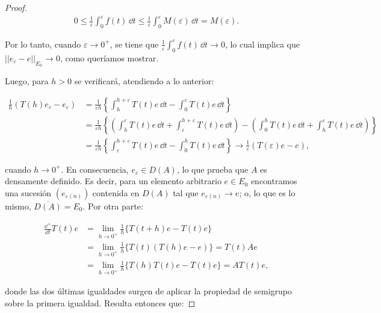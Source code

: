 \begin{proof}
    \begin{align*}
        0 \leq \frac{1}{\varepsilon} \int_0^{\varepsilon} f(t) \, \dd t \leq \frac{1}{\varepsilon} \int_0^{\varepsilon} M(\varepsilon) \, \dd t = M(\varepsilon).
    \end{align*}

    Por lo tanto, cuando $\varepsilon \rightarrow 0^+$, se tiene que $\frac{1}{\varepsilon}\int_0^{\varepsilon} f(t) \, \dd t \rightarrow 0$, lo cual implica que $||e_{\varepsilon} - e||_{E_0} \rightarrow 0$, como queríamos mostrar.

    Luego, para $h > 0$ se verificará, atendiendo a lo anterior:

    \begin{align*}
        \frac{1}{h}(T(h)e_{\varepsilon} - e_{\varepsilon}) &= \frac{1}{\varepsilon h} \left \{\int_{h}^{h + \varepsilon} T(t)e \, \dd t - \int_0^{\varepsilon} T(t)e \, \dd t \right \}\\
        &= \frac{1}{\varepsilon h} \left \{ \left ( \int_{h}^{\varepsilon} T(t)e \, \dd t + \int_{\varepsilon}^{h + \varepsilon} T(t)e \, \dd t\right ) - \left ( \int_0^{h} T(t)e \, \dd t + \int_h^{\varepsilon} T(t)e \, \dd t \right ) \right \}\\
        &= \frac{1}{\varepsilon h} \left \{\int_{\varepsilon}^{h + \varepsilon} T(t)e \, \dd t - \int_0^{h} T(t)e \, \dd t \right \} \rightarrow \frac{1}{\varepsilon}(T(\varepsilon)e - e),
    \end{align*}

    cuando $h \rightarrow 0^+$. En consecuencia, $e_{\varepsilon} \in D(A)$, lo que prueba que $A$ es densamente definido. Es decir, para un elemento arbitrario $e \in E_0$ encontramos una sucesión $(e_{\varepsilon(n)})$ contenida en $D(A)$ tal que $e_{\varepsilon(n)} \rightarrow e$; o, lo que es lo mismo, $\overline{D(A)} = E_0$. Por otra parte:

    \begin{align*}
        \frac{\dd^+}{\dd t}T(t)e &= \lim_{h \rightarrow 0^+} \frac{1}{h} \Big \{T(t + h)e - T(t)e \Big \}\\
        &= \lim_{h \rightarrow 0^+} \frac{1}{h} \Big \{T(t) (T(h)e - e)  \Big \} = T(t)Ae\\
        &= \lim_{h \rightarrow 0^+} \frac{1}{h} \Big \{T(h)T(t)e - T(t)e  \Big \} = AT(t)e,
    \end{align*}

    donde las dos últimas igualdades surgen de aplicar la propiedad de semigrupo sobre la primera igualdad. Resulta entonces que:


\end{proof}
